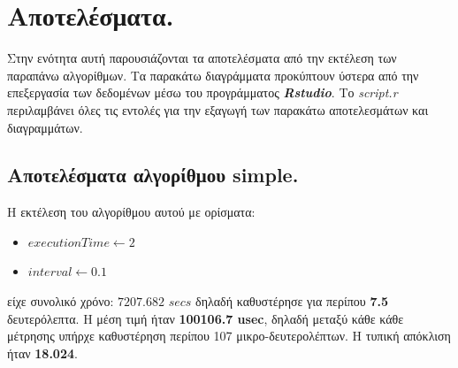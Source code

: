 \documentclass[12pt, a4paper]{article}
\begin{document}
\section{Αποτελέσματα.}
\justify
Στην ενότητα αυτή παρουσιάζονται τα αποτελέσματα από την εκτέλεση των παραπάνω αλγορίθμων. Τα παρακάτω διαγράμματα προκύπτουν ύστερα από την επεξεργασία των δεδομένων μέσω του προγράμματος \textlatin{\textbf{\textit{Rstudio}}}. Το \textlatin{\textit{script.r}} περιλαμβάνει όλες τις εντολές για την εξαγωγή των παρακάτω αποτελεσμάτων και διαγραμμάτων.

\subsection{Αποτελέσματα αλγορίθμου \textlatin{simple}.}
\justify
Η εκτέλεση του αλγορίθμου αυτού με ορίσματα:
\begin{itemize}
    \item $executionTime \longleftarrow 2$
    \item $interval \longleftarrow 0.1$
\end{itemize}
είχε συνολικό χρόνο: $7207.682$ $secs$ δηλαδή καθυστέρησε για περίπου \textbf{7.5} δευτερόλεπτα. Η μέση τιμή ήταν \textbf{100106.7 \textlatin{usec}}, δηλαδή μεταξύ κάθε κάθε μέτρησης υπήρχε καθυστέρηση περίπου 107 μικρο-δευτερολέπτων. Η τυπική απόκλιση ήταν \textbf{18.024}.
\end{document}
